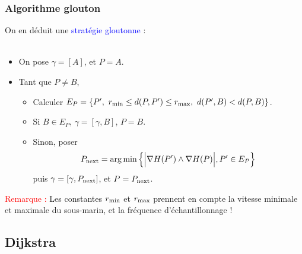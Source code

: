 \documentclass[11pt]{beamer}
\DeclareMathOperator*{\argmin}{arg\,min}
\begin{document}



\begin{frame}

\frametitle{Algorithme glouton}

On en déduit une \textcolor{blue}{stratégie gloutonne} : \\
~\\
\begin{itemize}
    \item On pose $\gamma = [A]$, et $P = A$.
    \item Tant que $P \neq B$,
    \begin{itemize}
        \item Calculer $E_P = \{P', \ r_{\rm min} \le d(P, P') \le r_{\rm max}, \ d(P', B) < d(P, B) \}$.
        \item Si $B \in E_P$, $\gamma = [\gamma, B]$, $P = B$.
        \item Sinon, poser
        \[
            P_{\rm next} = \argmin \left\{ \Big| \nabla H(P') \wedge \nabla H(P) \Big|, P' \in E_P    \right\}
        \]
        puis $\gamma = [\gamma, P_{\rm next}]$, et $P = P_{\rm next}$.
    \end{itemize}
\end{itemize}

\textcolor{red}{Remarque :}
Les constantes $r_{\rm min}$ et $r_{\rm max}$ prennent en compte la vitesse minimale et maximale du sous-marin, et la fréquence d'échantillonnage !


\end{frame}



\subsection{Dijkstra}
\end{document}
